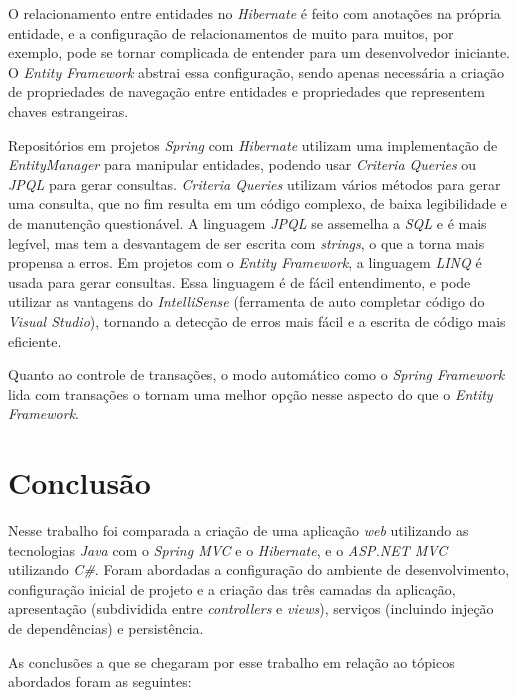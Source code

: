 \documentclass[a4paper,12pt]{article}
\newcommand{\est}[1] {
\textit{#1}}
\newcommand{\classe}[1] {
\textit{#1}}
\newcommand{\lang}[1] {
\textit{#1}}
\begin{document}
O relacionamento entre entidades no \est{Hibernate} é feito com anotações na própria entidade, e a configuração de relacionamentos de muito para muitos, por exemplo, pode se tornar complicada de entender para um desenvolvedor iniciante. O \est{Entity Framework} abstrai essa configuração, sendo apenas necessária a criação de propriedades de navegação entre entidades e propriedades que representem chaves estrangeiras.

Repositórios em projetos \est{Spring} com \est{Hibernate} utilizam uma implementação de \classe{EntityManager} para manipular entidades, podendo usar \est{Criteria Queries} ou \lang{JPQL} para gerar consultas. \est{Criteria Queries} utilizam vários métodos para gerar uma consulta, que no fim resulta em um código complexo, de baixa legibilidade e de manutenção questionável. A linguagem \lang{JPQL} se assemelha a \lang{SQL} e é mais legível, mas tem a desvantagem de ser escrita com \est{strings}, o que a torna mais propensa a erros. Em projetos com o \est{Entity Framework}, a linguagem \lang{LINQ} é usada para gerar consultas. Essa linguagem é de fácil entendimento, e pode utilizar as vantagens do \est{IntelliSense} (ferramenta de auto completar código do \est{Visual Studio}), tornando a detecção de erros mais fácil e a escrita de código mais eficiente.

Quanto ao controle de transações, o modo automático como o \est{Spring Framework} lida com transações o tornam uma melhor opção nesse aspecto do que o \est{Entity Framework}. 

\newpage
\section{Conclusão}

Nesse trabalho foi comparada a criação de uma aplicação \est{web} utilizando as tecnologias \lang{Java} com o \est{Spring MVC} e o \est{Hibernate}, e o \est{ASP.NET MVC} utilizando \lang{C\#}. Foram abordadas a configuração do ambiente de desenvolvimento, configuração inicial de projeto e a criação das três camadas da aplicação, apresentação (subdividida entre \est{controllers} e \est{views}), serviços (incluindo injeção de dependências) e persistência.

As conclusões a que se chegaram por esse trabalho em relação ao tópicos abordados foram as seguintes:
\end{document}
